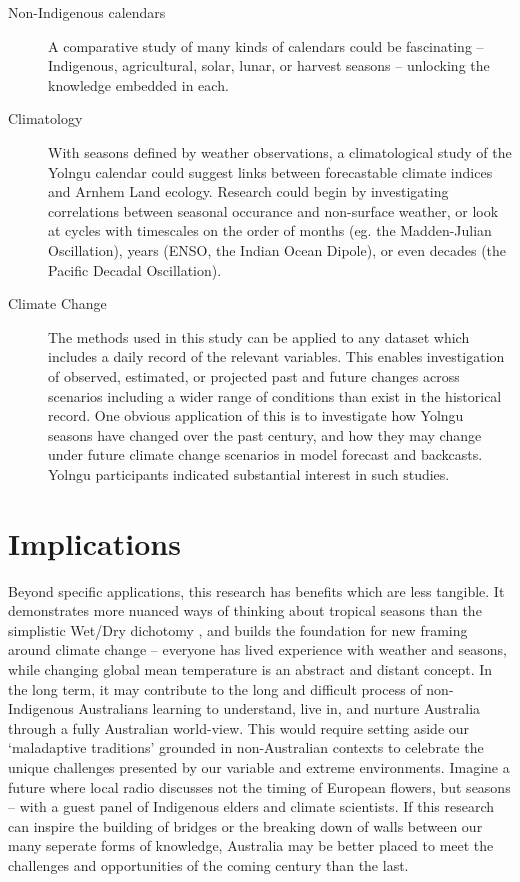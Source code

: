 \begin{description}
\item[Non-Indigenous calendars]
    A comparative study of many kinds of calendars could be fascinating --
    Indigenous, agricultural, solar, lunar, or harvest seasons -- unlocking
    the knowledge embedded in each.

\item[Climatology]
    With seasons defined by weather observations, a climatological study of the
    Yolngu calendar could suggest links between forecastable climate indices
    and Arnhem Land ecology.  Research could begin by investigating correlations
    between seasonal occurance and non-surface weather, or look at cycles with
    timescales on the order of months (eg. the Madden-Julian Oscillation), years (ENSO,
    the Indian Ocean Dipole), or even decades (the Pacific Decadal Oscillation).

\item[Climate Change]
    The methods used in this study can be applied to any dataset which
    includes a daily record of the relevant variables.  This enables
    investigation of observed, estimated, or projected past and future changes
    across scenarios including a wider range of conditions than exist in the historical record.
    One obvious application of this is to investigate how Yolngu seasons have
    changed over the past century, and how they may change under future climate
    change scenarios in model forecast and backcasts.  Yolngu participants
    indicated substantial interest in such studies.
\end{description}


\clearpage
\section{Implications}

Beyond specific applications, this research has benefits which are less tangible.
It demonstrates more nuanced ways of thinking about tropical seasons than the
simplistic Wet/Dry dichotomy \citep{willmett2009}, and builds the foundation
for new framing around climate change -- everyone has lived experience with
weather and seasons, while changing global mean temperature is an abstract and
distant concept.
%
In the long term, it may contribute to the long and difficult process of
non-Indigenous Australians learning to understand, live in, and nurture
Australia through a fully Australian world-view.  This would require setting
aside our `maladaptive traditions' grounded in non-Australian contexts
\citep{flannery1994} to celebrate the unique challenges presented by our variable and extreme
environments.  Imagine a future where local radio discusses not the timing of
European flowers, but seasons -- with a guest panel of Indigenous elders and
climate scientists.
%
If this research can inspire the building of bridges or the breaking down of walls
between our many seperate forms of knowledge, Australia may be better placed
to meet the challenges and opportunities of the coming century than the last.

